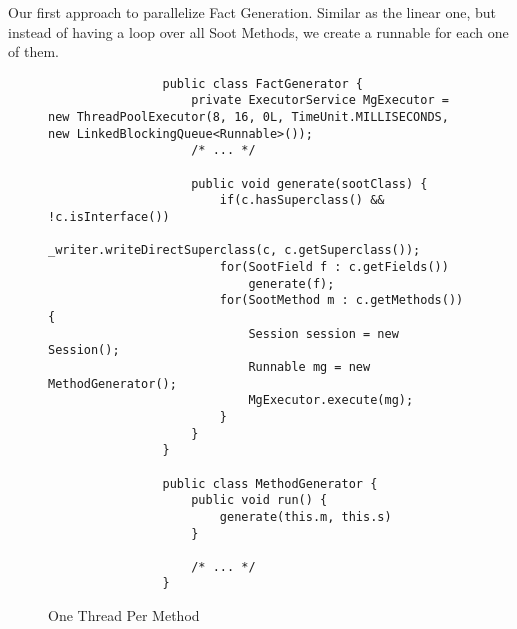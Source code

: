 \documentclass{dithesis}
\begin{document}
        Our first approach to parallelize Fact Generation. Similar as the linear one, but instead of having a loop over all Soot Methods, we create a runnable for each one of them. 
        \begin{figure}[H]
            \begin{lstlisting}
                public class FactGenerator {
                    private ExecutorService MgExecutor = new ThreadPoolExecutor(8, 16, 0L, TimeUnit.MILLISECONDS, new LinkedBlockingQueue<Runnable>());
                    /* ... */

                    public void generate(sootClass) {
                        if(c.hasSuperclass() && !c.isInterface())
                            _writer.writeDirectSuperclass(c, c.getSuperclass());
                        for(SootField f : c.getFields())
                            generate(f);
                        for(SootMethod m : c.getMethods()) {
                            Session session = new Session();
                            Runnable mg = new MethodGenerator();
                            MgExecutor.execute(mg);
                        }
                    }
                }

                public class MethodGenerator {
                    public void run() {
                        generate(this.m, this.s)
                    }

                    /* ... */
                }
            \end{lstlisting}
        \caption{One Thread Per Method}
        \end{figure}
\end{document}
